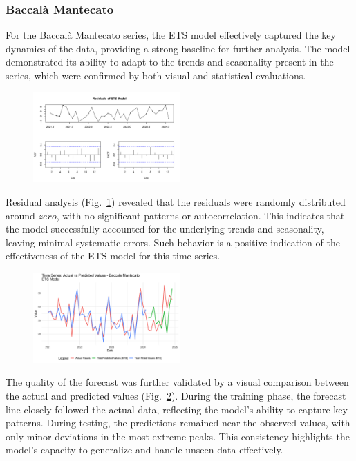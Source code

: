 \documentclass[10pt,twocolumn,letterpaper]{article}
\begin{document}
\subsubsection{Baccalà Mantecato}
For the Baccalà Mantecato series, the ETS model effectively captured the key dynamics of the data, providing a strong baseline for further analysis. The model demonstrated its ability to adapt to the trends and seasonality present in the series, which were confirmed by both visual and statistical evaluations.
\begin{figure}[h!]
    \centering
    \includegraphics[width=0.5\textwidth]{PlotsBEFD/Residuals_ETS_M.png} 
    \caption{}
    \label{fig:Residuals_ETS_M}
\end{figure}
Residual analysis (Fig.~\ref{fig:Residuals_ETS_M}) revealed that the residuals were randomly distributed around $zero$, with no significant patterns or autocorrelation. This indicates that the model successfully accounted for the underlying trends and seasonality, leaving minimal systematic errors. Such behavior is a positive indication of the effectiveness of the ETS model for this time series.
\begin{figure}[h!]
    \centering
    \includegraphics[width=0.5\textwidth]{PlotsBEFD/TS_M_ETS.png} 
    \caption{}
    \label{fig:TS_M_ETS}
\end{figure}
The quality of the forecast was further validated by a visual comparison between the actual and predicted values (Fig.~\ref{fig:TS_M_ETS}). During the training phase, the forecast line closely followed the actual data, reflecting the model's ability to capture key patterns. During testing, the predictions remained near the observed values, with only minor deviations in the most extreme peaks. This consistency highlights the model's capacity to generalize and handle unseen data effectively.
\end{document}
